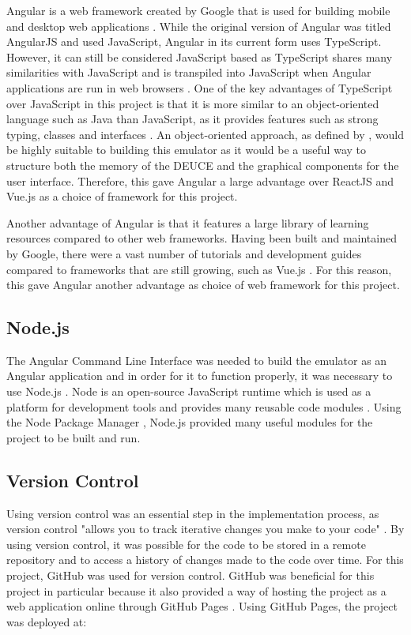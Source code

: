 \documentclass{l4proj}
\begin{document}
Angular is a web framework created by Google that is used for building mobile and desktop web applications \citep{angular19}. While the original version of Angular was titled AngularJS and used JavaScript, Angular in its current form uses TypeScript. However, it can still be considered JavaScript based as TypeScript shares many similarities with JavaScript and is transpiled into JavaScript when Angular applications are run in web browsers \citep{Clow18}. One of the key advantages of TypeScript over JavaScript in this project is that it is more similar to an object-oriented language such as Java than JavaScript, as it provides features such as strong typing, classes and interfaces \citep{typescript18}. An object-oriented approach, as defined by \citet{chambers14}, would be highly suitable to building this emulator as it would be a useful way to structure both the memory of the DEUCE and the graphical components for the user interface. Therefore, this gave Angular a large advantage over ReactJS and Vue.js as a choice of framework for this project.

Another advantage of Angular is that it features a large library of learning resources compared to other web frameworks. Having been built and maintained by Google, there were a vast number of tutorials and development guides compared to frameworks that are still growing, such as Vue.js \citep{vue19}. For this reason, this gave Angular another advantage as choice of web framework for this project.

\subsection{Node.js}
The Angular Command Line Interface was needed to build the emulator as an Angular application and in order for it to function properly, it was necessary to use Node.js \citep{node19}. Node is an open-source JavaScript runtime which is used as a platform for development tools and provides many reusable code modules \citep{ClowNode18}. Using the Node Package Manager \citep{npm19}, Node.js provided many useful modules for the project to be built and run.

\subsection{Version Control}
Using version control was an essential step in the implementation process, as version control "allows you to track iterative changes you make to your code" \citep{vcs16}. By using version control, it was possible for the code to be stored in a remote repository and to access a history of changes made to the code over time. For this project, GitHub \citep{github19} was used for version control. GitHub was beneficial for this project in particular because it also provided a way of hosting the project as a web application online through GitHub Pages \citep{githubpages19}. Using GitHub Pages, the project was deployed at:
\end{document}
